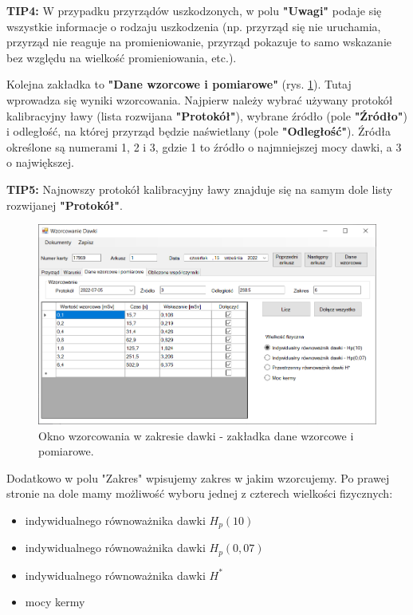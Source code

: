 {\textbf{TIP4:} W przypadku przyrządów uszkodzonych, w polu \textbf{"Uwagi"} podaje się wszystkie informacje o rodzaju uszkodzenia (np. przyrząd się nie uruchamia, przyrząd nie reaguje na promieniowanie, przyrząd pokazuje to samo wskazanie bez względu na wielkość promieniowania, etc.).

Kolejna zakładka to \textbf{"Dane wzorcowe i pomiarowe"} (rys. \ref{dawkaDane}). Tutaj wprowadza się wyniki wzorcowania. Najpierw należy wybrać używany protokół kalibracyjny ławy (lista rozwijana \textbf{"Protokół"}), wybrane źródło (pole \textbf{"Źródło"}) i odległość, na której przyrząd będzie naświetlany (pole \textbf{"Odległość"}). Źródła określone są numerami 1, 2 i 3, gdzie 1 to źródło o najmniejszej mocy dawki, a 3 o największej.

\textbf{TIP5:} Najnowszy protokół kalibracyjny ławy znajduje się na samym dole listy rozwijanej \textbf{"Protokół"}.

\begin{figure}[htb]
	\centering
	\includegraphics[width=\columnwidth]{obrazki/Wzorcowanie/dawka/dane.png}
	\caption{Okno wzorcowania w zakresie dawki - zakładka dane wzorcowe i pomiarowe.}
	\label{dawkaDane}
\end{figure}

Dodatkowo w polu "Zakres" wpisujemy zakres w jakim wzorcujemy. Po prawej stronie na dole mamy możliwość wyboru jednej z czterech wielkości fizycznych:
\begin{itemize}
	\item indywidualnego równoważnika dawki $H_{p}(10)$
	\item indywidualnego równoważnika dawki $H_{p}(0,07)$
	\item indywidualnego równoważnika dawki $H^{*}$
	\item mocy kermy
\end{itemize}

}
